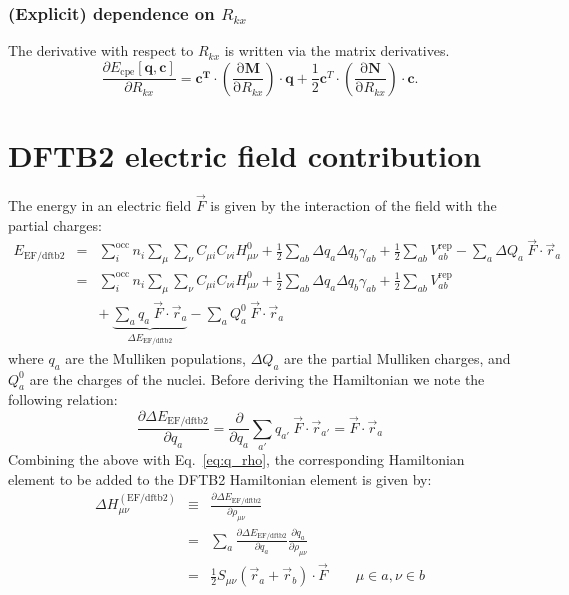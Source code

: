 \documentclass{article}
\numberwithin{equation}{section}
\begin{document}
\subsubsection{(Explicit) dependence on $R_{kx}$}
The derivative with respect to $R_{kx}$ is written via the matrix derivatives.
\begin{equation}
    \frac{\partial E_\mathrm{{cpe}}\left[\mathbf{q}, \mathbf{c}\right]}{\partial R_{kx}} = 
    \mathbf{c^T} \cdot \left( \frac{\mathrm{\partial}\mathbf{M}}{\mathrm{\partial}R_{kx}}\right) \cdot \mathbf{q} 
    + \frac{1}{2}\mathbf{c}^T \cdot \left( \frac{\mathrm{\partial}\mathbf{N}}{\mathrm{\partial}R_{kx}}\right) \cdot \mathbf{c}. 
\end{equation}


\clearpage
\section{DFTB2 electric field contribution}
The energy in an electric field $\vec{F}$ is given by the interaction of the field with the partial charges:
\begin{eqnarray}
    E_\mathrm{EF/dftb2} 
    &=& \sum_i^\mathrm{occ} n_i  \sum_\mu \sum_\nu C_{\mu i}  C_{\nu i} H^0_{\mu\nu} + \frac{1}{2} \sum_{ab} \Delta q_a \Delta q_b \gamma_{ab}+ \frac{1}{2} \sum_{ab} V^\mathrm{rep}_{ab} - \sum_a \Delta Q_a\ \vec{F} \cdot \vec{r}_a\nonumber\\
    &=& \sum_i^\mathrm{occ} n_i  \sum_\mu \sum_\nu C_{\mu i}  C_{\nu i} H^0_{\mu\nu} + \frac{1}{2} \sum_{ab} \Delta q_a \Delta q_b \gamma_{ab}+ \frac{1}{2} \sum_{ab} V^\mathrm{rep}_{ab} \\
    &&+\ \underbrace{\sum_a q_a\ \vec{F} \cdot \vec{r}_a}_{\Delta E_{\mathrm{EF/dftb2}}}\label{eq:dftb_ef_energy} - \sum_a Q^0_a\ \vec{F} \cdot \vec{r}_a
\end{eqnarray}
where $q_a$ are the Mulliken populations, $\Delta Q_a$ are the partial Mulliken charges, and $Q^0_a$ are the charges of the nuclei.
Before deriving the Hamiltonian we note the following relation:
\begin{equation}
    \frac{\partial \Delta E_{\mathrm{EF/dftb2}}}{\partial q_a}
    = \frac{\partial}{\partial q_a} \sum_{a'} q_{a'}\ \vec{F} \cdot \vec{r}_{a'} = \vec{F} \cdot \vec{r}_a
\end{equation}
Combining the above with Eq.~\ref{eq:q_rho}, the corresponding Hamiltonian element to be added to the DFTB2 Hamiltonian element is given by:
\begin{eqnarray}
    \Delta H_{\mu\nu}^{\mathrm{(EF/dftb2)}} 
    &\equiv& \frac{\partial \Delta  E_{\mathrm{EF/dftb2}}}{\partial \rho_{\mu\nu}}\nonumber\\
    &=&  \sum_a \frac{\partial \Delta  E_{\mathrm{EF/dftb2}}}{\partial q_a} 
     \frac{\partial q_a}{\partial \rho_{\mu\nu}}\nonumber\\
     &=& \frac{1}{2} S_{\mu\nu} \left( \vec{r}_a + \vec{r}_b
 \right) \cdot \vec{F}  \qquad \mu \in a, \nu \in b
\end{eqnarray}
\end{document}

